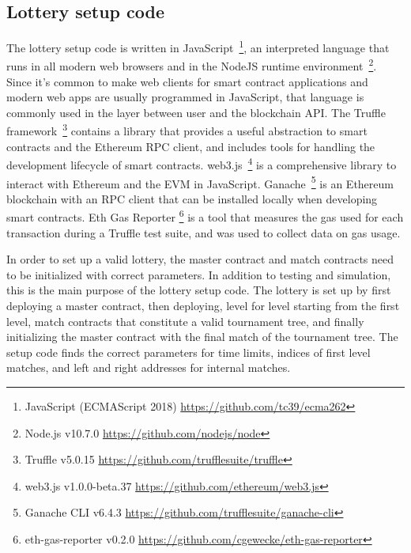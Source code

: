 


\subsection{Lottery setup code}
The lottery setup code is written in JavaScript~\footnote{JavaScript (ECMAScript 2018) \url{https://github.com/tc39/ecma262}}, an interpreted language that runs in all modern web browsers and in the NodeJS runtime environment~\footnote{Node.js v10.7.0 \url{https://github.com/nodejs/node}}. Since it's common to make web clients for smart contract applications and modern web apps are usually programmed in JavaScript, that language is commonly used in the layer between user and the blockchain API. The Truffle framework~\footnote{Truffle v5.0.15 \url{https://github.com/trufflesuite/truffle}} contains a library that provides a useful abstraction to smart contracts and the Ethereum RPC client, and includes tools for handling the development lifecycle of smart contracts. web3.js~\footnote{web3.js v1.0.0-beta.37 \url{https://github.com/ethereum/web3.js}} is a comprehensive library to interact with Ethereum and the EVM in JavaScript. Ganache~\footnote{Ganache CLI v6.4.3 \url{https://github.com/trufflesuite/ganache-cli}} is an Ethereum blockchain with an RPC client that can be installed locally when developing smart contracts. Eth Gas Reporter \footnote{eth-gas-reporter v0.2.0 \url{https://github.com/cgewecke/eth-gas-reporter}} is a tool that measures the gas used for each transaction during a Truffle test suite, and was used to collect data on gas usage.

In order to set up a valid lottery, the master contract and match contracts need to be initialized with correct parameters. In addition to testing and simulation, this is the main purpose of the lottery setup code. The lottery is set up by first deploying a master contract, then deploying, level for level starting from the first level, match contracts that constitute a valid tournament tree, and finally initializing the master contract with the final match of the tournament tree. The setup code finds the correct parameters for time limits, indices of first level matches, and left and right addresses for internal matches. 

